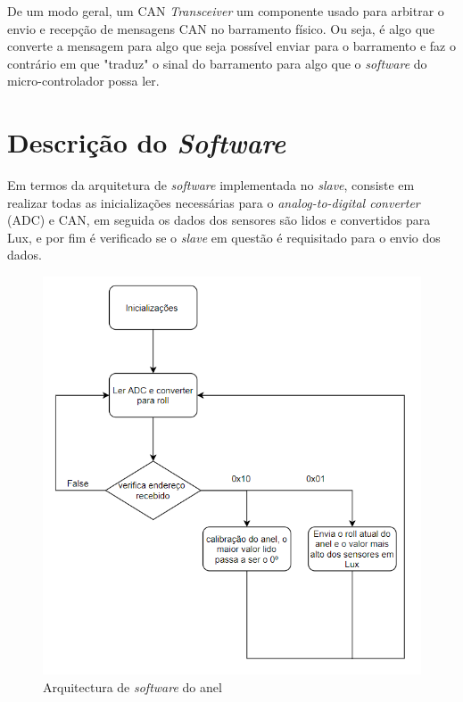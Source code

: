 De um modo geral, um CAN \textit{Transceiver} um componente usado para arbitrar o envio e recepção de mensagens CAN no barramento físico. Ou seja, é algo que converte a mensagem para algo que seja possível enviar para o barramento e faz o contrário em que "traduz" o sinal do barramento para algo que o \textit{software} do micro-controlador possa ler. 



\section{Descrição do \textit{Software}}

Em termos da arquitetura de \textit{software} implementada no \textit{slave}, consiste em realizar todas as inicializações necessárias para o \textit{analog-to-digital converter} (ADC) e CAN, em seguida os dados dos sensores são lidos e convertidos para Lux, e por fim é verificado se o \textit{slave} em questão é requisitado para o envio dos dados.

\begin{figure}[!htb]
\centering
\includegraphics[scale=0.8]{Figuras/software.PNG}
\caption{Arquitectura de \textit{software} do anel}
\label{Rotulo}
\end{figure}